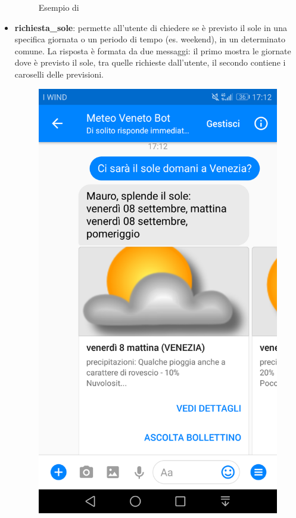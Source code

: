 \begin{itemize}
\begin{figure}[h]
		\caption{Esempio di }
	\end{figure}	
	\item \textbf{richiesta\_sole}: permette all'utente di chiedere se è previsto il sole in una specifica giornata o un periodo di tempo (es. weekend), in un determinato comune. La risposta è formata da due messaggi: il primo mostra le giornate dove è previsto il sole, tra quelle richieste dall'utente, il secondo contiene i caroselli delle previsioni.
	\begin{figure}[!h]
		\centering
		\includegraphics[scale=0.12]{../Immagini/richiesta_sole.png}

\end{figure}
\end{itemize}
